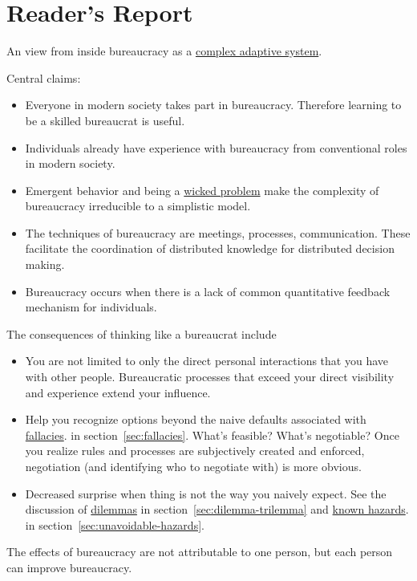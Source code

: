 \section{Reader's Report\label{sec:reader-report}}
An view from inside bureaucracy as a \href{https://en.wikipedia.org/wiki/Complexity_theory_and_organizations}{complex adaptive system}. 

Central claims:
\begin{itemize}
    \item Everyone in modern society takes part in bureaucracy. Therefore learning to be a skilled bureaucrat is useful.
    \item Individuals already have experience with bureaucracy from conventional roles in modern society. 
    \item Emergent behavior and being a \href{https://en.wikipedia.org/wiki/Wicked_problem}{wicked problem} make the complexity of bureaucracy irreducible to a simplistic model.
    \item The techniques of bureaucracy are meetings, processes, communication. These facilitate the coordination of distributed knowledge for distributed decision making.  
    \item Bureaucracy occurs when there is a lack of common quantitative feedback mechanism for individuals.
\end{itemize}
The consequences of thinking like a bureaucrat include
\begin{itemize}
    \item You are not limited to only the direct personal interactions that you have with other people. Bureaucratic processes that exceed your direct visibility and experience extend your influence.
    \item Help you recognize options beyond the naive defaults associated with \hyperref[sec:fallacies]{fallacies}.
    \ifsectionref
    in section~\ref{sec:fallacies}. 
    \fi
    What's feasible? What's negotiable? Once you realize rules and processes are subjectively created and enforced, negotiation (and identifying who to negotiate with) is more obvious.
    \item Decreased surprise when thing is not the way you naively expect. See the discussion of \hyperref[sec:dilemma-trilemma]{dilemmas}
    \ifsectionref
    in section~\ref{sec:dilemma-trilemma} 
    \fi
    and 
    \hyperref[sec:unavoidable-hazards]{known hazards}.
    \ifsectionref
    in section~\ref{sec:unavoidable-hazards}.
    \fi
\end{itemize}


The effects of bureaucracy are not attributable to one person, but each person can improve bureaucracy.